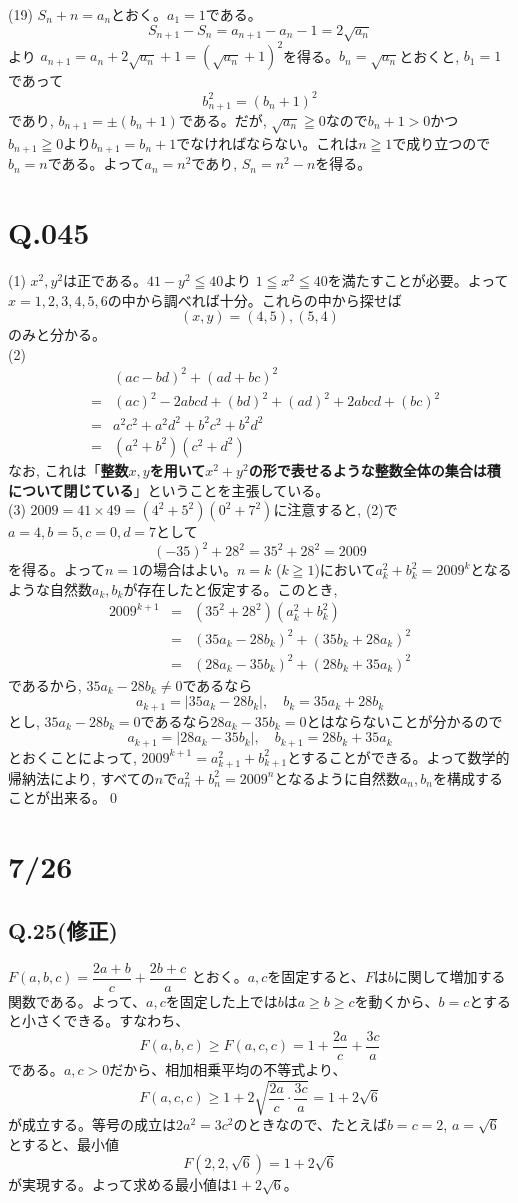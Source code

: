 \documentclass[twocolumn]{jbook}
\newcommand{\beqn}{\begin{eqnarray*}}
\newcommand{\eeqn}{\end{eqnarray*}}
\renewcommand{\leq}{\leqq}
\renewcommand{\geq}{\geqq}
\begin{document}
(19) $S_n + n = a_n$とおく。$a_1 = 1$である。
\[S_{n+1} - S_n = a_{n+1} - a_n -1 = 2\sqrt{a_n}\]
より $a_{n+1} = a_n + 2\sqrt{a_n} + 1 = (\sqrt{a_n} + 1)^2$を得る。$b_n = \sqrt{a_n}$とおくと, $b_1 = 1$であって
\[b_{n+1}^2 = (b_n + 1)^2 \]
であり, $b_{n+1} = \pm (b_n + 1)$である。だが, $\sqrt{a_n} \geq 0$なので$b_n + 1 > 0$かつ$b_{n+1} \geq 0$より$b_{n+1} = b_n + 1$でなければならない。これは$n\geq 1$で成り立つので$b_n = n$である。よって$a_n = n^2$であり, $S_n = n^2 - n$を得る。


\section{Q.045}
(1) $x^2,y^2$は正である。$41-y^2 \leq 40$より $1\leq x^2 \leq 40$を満たすことが必要。よって$x=1,2,3,4,5,6$の中から調べれば十分。これらの中から探せば
\[(x,y) = (4,5), (5,4)\]
のみと分かる。\\
(2) \beqn
&&(ac-bd)^2 + (ad+bc)^2\\
&=& (ac)^2 -2abcd + (bd)^2 + (ad)^2 + 2abcd + (bc)^2\\
&=& a^2c^2 + a^2d^2 + b^2c^2 + b^2d^2\\
&=& (a^2+b^2)(c^2+d^2)
\eeqn
なお, これは「\textbf{整数$x,y$を用いて$x^2+y^2$の形で表せるような整数全体の集合は積について閉じている}」ということを主張している。\\
(3) $2009 = 41\times 49 = (4^2+5^2)(0^2 + 7^2)$に注意すると, (2)で$a=4,b=5,c=0,d=7$として
\[(-35)^2 + 28^2 = 35^2 + 28^2 = 2009\]
を得る。よって$n=1$の場合はよい。$n=k$ ($k\geq 1$)において$a_k^2+ b_k^2 = 2009^{k}$となるような自然数$a_k,b_k$が存在したと仮定する。このとき, 
\beqn
2009^{k+1} &=& (35^2 + 28^2)(a_k^2+b_k^2)\\
&=& (35a_k - 28b_k)^2 + (35b_k + 28a_k)^2\\
&=& (28a_k - 35b_k)^2 + (28b_k + 35a_k)^2
\eeqn
であるから, $35a_k -28b_k \neq 0$であるなら
\[a_{k+1} = |35a_k - 28b_k|, \quad b_k = 35a_k + 28b_k\]
とし, $35a_k -28b_k = 0$であるなら$28a_k - 35b_k = 0$とはならないことが分かるので
\[a_{k+1} = |28a_k - 35b_k|,\quad b_{k+1} = 28b_k + 35a_k\]
とおくことによって, $2009^{k+1} = a_{k+1}^2 + b_{k+1}^2$とすることができる。よって数学的帰納法により, すべての$n$で$a_n^2 + b_n^2 = 2009^{n}$となるように自然数$a_n,b_n$を構成することが出来る。\qed



\section*{7/26}
\subsection*{Q.25(修正)}
$F(a, b, c)=\dfrac{2a+b}{c}+\dfrac{2b+c}{a}$ とおく。$a, c$を固定すると、$F$は$b$に関して増加する関数である。よって、$a, c$を固定した上では$b$は$a\ge b\ge c$を動くから、$b=c$とすると小さくできる。すなわち、
\[ F(a, b, c)\ge F(a, c, c)=1+\frac{2a}{c}+\frac{3c}{a} \]
である。$a, c>0$だから、相加相乗平均の不等式より、
\[ F(a, c, c)\ge 1+2\sqrt{\frac{2a}{c}\cdot\frac{3c}{a}}=1+2\sqrt{6} \]
が成立する。等号の成立は$2a^2=3c^2$のときなので、たとえば$b=c=2$, $a=\sqrt{6}$とすると、最小値
\[ F(2, 2, \sqrt{6})=1+2\sqrt{6} \]
が実現する。よって求める最小値は$1+2\sqrt{6}$。
\end{document}
